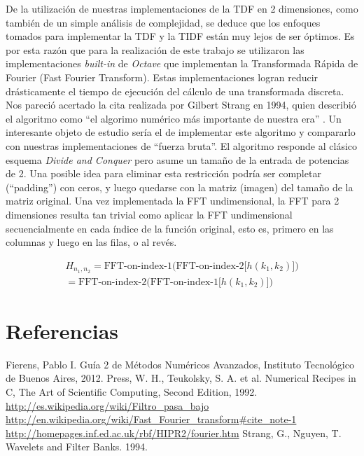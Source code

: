 \documentclass[twocolumn,a4paper,10pt]{article}
\begin{document}
De la utilizaci\'on de nuestras implementaciones de la TDF en 2 dimensiones, como tambi\'en de un simple an\'alisis de complejidad, se deduce que los enfoques 
tomados para implementar la TDF y la TIDF est\'an muy lejos de ser \'optimos. Es por esta raz\'on que para la realizaci\'on de este trabajo se utilizaron las 
implementaciones \textit{built-in} de \textit{Octave} que implementan la Transformada R\'apida de Fourier (Fast Fourier Transform). Estas implementaciones 
logran reducir dr\'asticamente el tiempo de ejecuci\'on del c\'alculo de una transformada discreta. Nos pareci\'o acertado la cita realizada por 
Gilbert Strang en 1994, quien describi\'o el algoritmo como ``el algorimo num\'erico m\'as importante de nuestra era'' \cite{Wikipedia_FFT_quote} 
\cite{Strang-quote}. Un interesante objeto de estudio ser\'ia el de implementar este algoritmo y compararlo con nuestras implementaciones de ``fuerza bruta''.
El algoritmo responde al cl\'asico esquema \textit{Divide and Conquer} pero asume un tamaño de la entrada de potencias de 2. Una posible idea para eliminar esta
restricci\'on podr\'ia ser completar (``padding'') con ceros, y luego quedarse con la matriz (imagen) del tamaño de la matriz original. Una vez implementada
la FFT undimensional, la FFT para 2 dimensiones resulta tan trivial como aplicar la FFT undimensional secuencialmente en cada \'indice de la funci\'on original,
esto es, primero en las columnas y luego en las filas, o al rev\'es\cite{NumericalRecipes}.

\begin{equation}
    \left.
        \begin{array}{l}
            H_{n_1,n_2}  = \mbox{FFT-on-index-1(FFT-on-index-2[} h(k_1, k_2) \mbox{])} \\
            = \mbox{FFT-on-index-2(FFT-on-index-1[} h(k_1, k_2) \mbox{])}
        \end{array}               
    \right.
\end{equation}


\section*{Referencias}

\begin{thebibliography}{99}

     Fierens, Pablo I. Gu\'ia 2 de M\'etodos Num\'ericos Avanzados, Instituto Tecnol\'ogico de Buenos Aires, 2012.
     Press, W. H., Teukolsky, S. A. et al. Numerical Recipes in C, The Art of Scientific Computing, Second Edition, 1992.
     \url{http://es.wikipedia.org/wiki/Filtro_pasa_bajo}
     \url{http://en.wikipedia.org/wiki/Fast_Fourier_transform#cite_note-1}
     \url{http://homepages.inf.ed.ac.uk/rbf/HIPR2/fourier.htm}
     Strang, G., Nguyen, T. Wavelets and Filter Banks. 1994.
    
\end{thebibliography}
\end{document}
